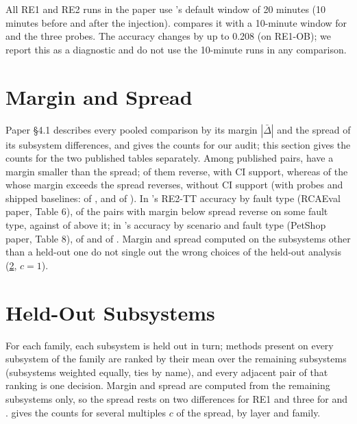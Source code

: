 \documentclass[10pt]{article}
\begin{document}
All RE1 and RE2 runs in the paper use \rcaeval's default window of 20 minutes (10 minutes before and after the injection).
 compares it with a 10-minute window for \baro and the three probes.
The accuracy changes by up to 0.208 (\maxz on RE1-OB); we report this as a diagnostic and do not use the 10-minute runs in any comparison.



\section{Margin and Spread}
\label{sec:margin}

Paper \S4.1 describes every pooled comparison by its margin $|\bar\Delta|$ and the spread of its subsystem differences, and gives the counts for our audit; this section gives the counts for the two published tables separately.
Among published pairs, \NPubBelow have a margin smaller than the spread; \NPubBelowRev of them reverse, \NPubBelowRevCI with CI support, whereas of the \NPubAbove whose margin exceeds the spread \NPubAboveRev reverses, without CI support (with probes and shipped baselines: \NAllBelowRev of \NAllBelow, and \NAllAboveRev of \NAllAbove).
In \rcaeval's RE2-TT accuracy by fault type (RCAEval paper, Table 6), \NTabRcaevalBelowRev of the \NTabRcaevalBelow pairs with margin below spread reverse on some fault type, against \NTabRcaevalAboveRev of \NTabRcaevalAbove above it; in \petshop's accuracy by scenario and fault type (PetShop paper, Table 8), \NTabPetshopBelowRev of \NTabPetshopBelow and \NTabPetshopAboveRev of \NTabPetshopAbove.
Margin and spread computed on the subsystems other than a held-out one do not single out the wrong choices of the held-out analysis (\cref{supp:heldout-sec}, $c = 1$).

\section{Held-Out Subsystems}
\label{supp:heldout-sec}
For each family, each subsystem is held out in turn; methods present on every subsystem of the family are ranked by their mean over the remaining subsystems (subsystems weighted equally, ties by name), and every adjacent pair of that ranking is one decision. Margin and spread are computed from the remaining subsystems only, so the spread rests on two differences for RE1 and three for \openrca and \petshop.  gives the counts for several multiples $c$ of the spread, by layer and family.
\end{document}
